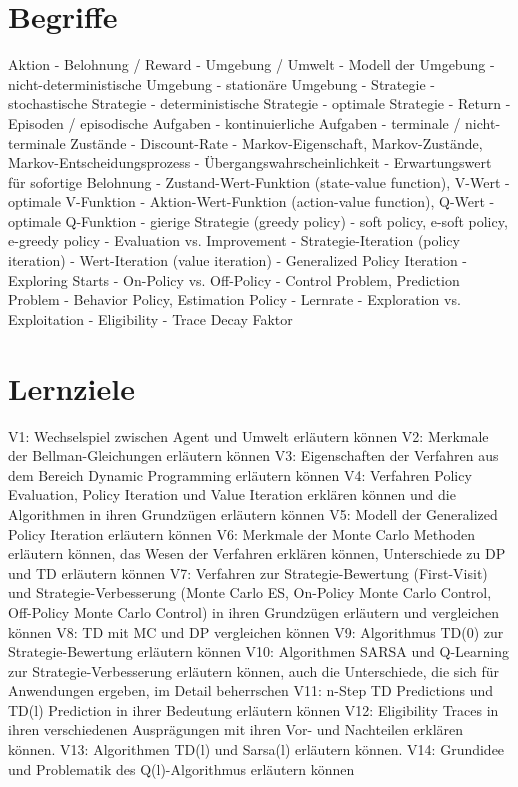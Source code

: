 \documentclass[10pt]{scrartcl}
\author{Steffen Brauer, André Harms,\\ Florian Johannßen, Jan-Christoph Meier,\\ Florian Ocker, Olaf Potratz,\\ Torben Woggan}
\title{\titletext}
\date{10.06.2012}
\begin{document}
\maketitle

\setcounter{tocdepth}{3}
\tableofcontents

	\listoffigures  
\newpage
\section{Begriffe}
Aktion
- Belohnung / Reward
- Umgebung / Umwelt
- Modell der Umgebung
- nicht-deterministische Umgebung
- stationäre Umgebung
- Strategie
- stochastische Strategie
- deterministische Strategie
- optimale Strategie
- Return
- Episoden / episodische Aufgaben
- kontinuierliche Aufgaben
- terminale / nicht-terminale Zustände
- Discount-Rate
- Markov-Eigenschaft, Markov-Zustände, Markov-Entscheidungsprozess
- Übergangswahrscheinlichkeit
- Erwartungswert für sofortige Belohnung
- Zustand-Wert-Funktion (state-value function), V-Wert
- optimale V-Funktion
- Aktion-Wert-Funktion (action-value function), Q-Wert
- optimale Q-Funktion
- gierige Strategie (greedy policy)
- soft policy, e-soft policy, e-greedy policy
- Evaluation vs. Improvement
- Strategie-Iteration (policy iteration)
- Wert-Iteration (value iteration)
- Generalized Policy Iteration
- Exploring Starts
- On-Policy vs. Off-Policy
- Control Problem, Prediction Problem
- Behavior Policy, Estimation Policy
- Lernrate
- Exploration vs. Exploitation
- Eligibility
- Trace Decay Faktor

\section{Lernziele}
V1: Wechselspiel zwischen Agent und Umwelt erläutern können
V2: Merkmale der Bellman-Gleichungen erläutern können
V3: Eigenschaften der Verfahren aus dem Bereich Dynamic Programming erläutern
können
V4: Verfahren Policy Evaluation, Policy Iteration und Value Iteration erklären können und
die Algorithmen in ihren Grundzügen erläutern können
V5: Modell der Generalized Policy Iteration erläutern können
V6: Merkmale der Monte Carlo Methoden erläutern können, das Wesen der Verfahren
erklären können, Unterschiede zu DP und TD erläutern können
V7: Verfahren zur Strategie-Bewertung (First-Visit) und Strategie-Verbesserung (Monte
Carlo ES, On-Policy Monte Carlo Control, Off-Policy Monte Carlo Control) in ihren
Grundzügen erläutern und vergleichen können
V8: TD mit MC und DP vergleichen können
V9: Algorithmus TD(0) zur Strategie-Bewertung erläutern können
V10: Algorithmen SARSA und Q-Learning zur Strategie-Verbesserung erläutern können,
auch die Unterschiede, die sich für Anwendungen ergeben, im Detail beherrschen
V11: n-Step TD Predictions und TD(l) Prediction in ihrer Bedeutung erläutern können
V12: Eligibility Traces in ihren verschiedenen Ausprägungen mit ihren Vor- und Nachteilen
erklären können.
V13: Algorithmen TD(l) und Sarsa(l) erläutern können.
V14: Grundidee und Problematik des Q(l)-Algorithmus erläutern können
\end{document}
